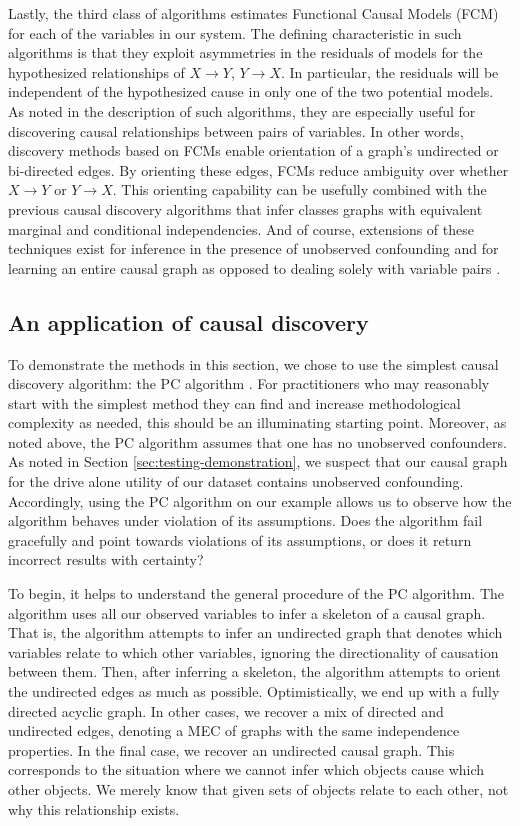 Lastly, the third class of algorithms estimates Functional Causal Models (FCM) \citep{goudet_2018_learning} for each of the variables in our system.
The defining characteristic in such algorithms is that they exploit asymmetries in the residuals of models for the hypothesized relationships of $X \rightarrow Y$, $Y \rightarrow X$.
In particular, the residuals will be independent of the hypothesized cause in only one of the two potential models.
As noted in the description of such algorithms, they are especially useful for discovering causal relationships between pairs of variables.
In other words, discovery methods based on FCMs enable orientation of a graph's undirected or bi-directed edges.
By orienting these edges, FCMs reduce ambiguity over whether $X \rightarrow Y$ or $Y \rightarrow X$.
This orienting capability can be usefully combined with the previous causal discovery algorithms that infer classes graphs with equivalent marginal and conditional independencies.
And of course, extensions of these techniques exist for inference in the presence of unobserved confounding \citep[Sec. 6]{goudet_2018_learning} and for learning an entire causal graph as opposed to dealing solely with variable pairs \citep{zheng_2020_learning}.

\subsection{An application of causal discovery}
\label{sec:discovery-application}
To demonstrate the methods in this section, we chose to use the simplest causal discovery algorithm: the PC algorithm \citep{glymour_2001_causation}.
For practitioners who may reasonably start with the simplest method they can find and increase methodological complexity as needed, this should be an illuminating starting point.
Moreover, as noted above, the PC algorithm assumes that one has no unobserved confounders.
As noted in Section \ref{sec:testing-demonstration}, we suspect that our causal graph for the drive alone utility of our dataset contains unobserved confounding.
Accordingly, using the PC algorithm on our example allows us to observe how the algorithm behaves under violation of its assumptions.
Does the algorithm fail gracefully and point towards violations of its assumptions, or does it return incorrect results with certainty?

To begin, it helps to understand the general procedure of the PC algorithm. The algorithm uses all our observed variables to infer a skeleton of a causal graph.
That is, the algorithm attempts to infer an undirected graph that denotes which variables relate to which other variables, ignoring the directionality of causation between them.
Then, after inferring a skeleton, the algorithm attempts to orient the undirected edges as much as possible.
Optimistically, we end up with a fully directed acyclic graph.
In other cases, we recover a mix of directed and undirected edges, denoting a MEC of graphs with the same independence properties.
In the final case, we recover an undirected causal graph.
This corresponds to the situation where we cannot infer which objects cause which other objects.
We merely know that given sets of objects relate to each other, not why this relationship exists.

